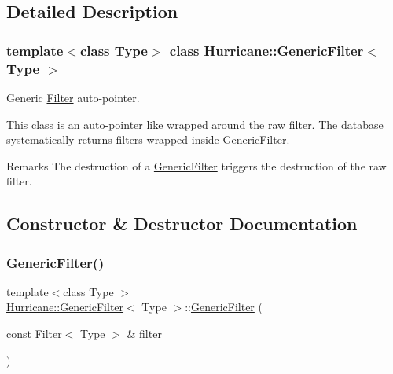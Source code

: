 \subsection{Detailed Description}
\subsubsection*{template$<$class Type$>$\newline
class Hurricane\+::\+Generic\+Filter$<$ Type $>$}

Generic \mbox{\hyperlink{classHurricane_1_1Filter}{Filter}} auto-\/pointer. 

This class is an auto-\/pointer like wrapped around the raw filter. The database systematically returns filters wrapped inside \mbox{\hyperlink{classHurricane_1_1GenericFilter}{Generic\+Filter}}.

\begin{DoxyRemark}{Remarks}
The destruction of a \mbox{\hyperlink{classHurricane_1_1GenericFilter}{Generic\+Filter}} triggers the destruction of the raw filter. 
\end{DoxyRemark}


\subsection{Constructor \& Destructor Documentation}
\mbox{\label{classHurricane_1_1GenericFilter_a1aae208fe9937dd3a6f706ceb8b3b9b4}} 
\subsubsection{\texorpdfstring{Generic\+Filter()}{GenericFilter()}\hspace{0.1cm}{\footnotesize\ttfamily [1/3]}}
{\footnotesize\ttfamily template$<$class Type $>$ \\
\mbox{\hyperlink{classHurricane_1_1GenericFilter}{Hurricane\+::\+Generic\+Filter}}$<$ Type $>$\+::\mbox{\hyperlink{classHurricane_1_1GenericFilter}{Generic\+Filter}} (\begin{DoxyParamCaption}\item[{const \mbox{\hyperlink{classHurricane_1_1Filter}{Filter}}$<$ Type $>$ \&}]{filter }\end{DoxyParamCaption})\hspace{0.3cm}{\ttfamily [inline]}}

